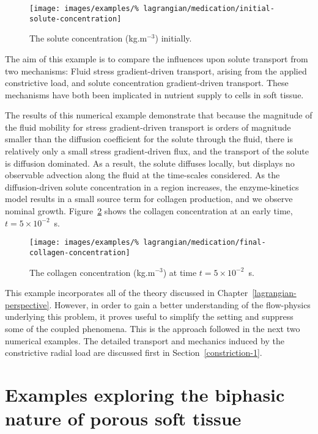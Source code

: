 \begin{figure}[!hpt]
  \centering
  \texttt{[image: images/examples/\%
    lagrangian/medication/initial-solute-concentration]}
  \caption{The solute concentration (kg.m$^{-3}$) initially.}
  \label{eg3ini}
\end{figure}

The aim of this example is to compare the influences upon solute
transport from two mechanisms: Fluid stress gradient-driven transport,
arising from the applied constrictive load, and solute concentration
gradient-driven transport. These mechanisms have both been implicated
in nutrient supply to cells in soft tissue.

The results of this numerical example demonstrate that because the
magnitude of the fluid mobility for stress gradient-driven transport
is orders of magnitude smaller than the diffusion coefficient for the
solute through the fluid, there is relatively only a small stress
gradient-driven flux, and the transport of the solute is diffusion
dominated. As a result, the solute diffuses locally, but displays no
observable advection along the fluid at the time-scales considered. As
the diffusion-driven solute concentration in a region increases, the
enzyme-kinetics model results in a small source term for collagen
production, and we observe nominal growth. Figure~\ref{eg3conc} shows
the collagen concentration at an early time, $t=5\times10^{-2}$~s.

\begin{figure}[!hpt]
  \centering
  \texttt{[image: images/examples/\%
    lagrangian/medication/final-collagen-concentration]}
  \caption{The collagen concentration (kg.m$^{-3}$) at time
    $t=5\times10^{-2}$~s.}
  \label{eg3conc}
\end{figure}

This example incorporates all of the theory discussed in
Chapter~\ref{lagrangian-perspective}. However, in order to gain a
better understanding of the flow-physics underlying this problem, it
proves useful to simplify the setting and suppress some of the coupled
phenomena. This is the approach followed in the next two numerical
examples. The detailed transport and mechanics induced by the
constrictive radial load are discussed first in
Section~\ref{constriction-1}.

\section{Examples exploring the biphasic nature of porous soft tissue}
\label{biphasic-examples-1}

